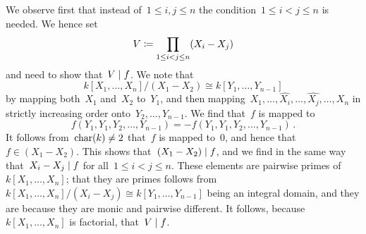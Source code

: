 \section{}

We observe first that instead of~$1 \leq i, j \leq n$ the condition~$1 \leq i < j \leq n$ is needed.
We hence set
\[
  V
  \coloneqq
  \prod_{1 \leq i < j \leq n} (X_i - X_j)
\]
and need to show that~$V \mid f$.
We note that
\[
  k[X_1, \dotsc, X_n]/(X_1 - X_2)
  \cong
  k[Y_1, \dotsc, Y_{n-1}]
\]
by mapping both~$X_1$ and~$X_2$ to~$Y_1$, and then mapping~$X_1, \dotsc, \widehat{X_i}, \dotsc, \widehat{X_j}, \dotsc, X_n$ in strictly increasing order onto~$Y_2, \dotsc, Y_{n-1}$.
We find that~$f$ is mapped to
\[
  f(Y_1, Y_1, Y_2, \dotsc, Y_{n-1})
  =
  -f(Y_1, Y_1, Y_2, \dotsc, Y_{n-1})  \,.
\]
It follows from~$\operatorname{char}(k) \neq 2$ that~$f$ is mapped to~$0$, and hence that~$f \in (X_1 - X_2)$.
This shows that~$(X_1 - X_2) \mid f$, and we find in the same way that~$X_i - X_j \mid f$ for all~$1 \leq i < j \leq n$.
These elements are pairwise  primes of~$k[X_1, \dotsc, X_n]$;
that they are primes follows from~$k[X_1, \dotsc, X_n]/(X_i - X_j) \cong k[Y_1, \dotsc, Y_{n-1}]$ being an integral domain, and they are  because they are monic and pairwise different.
It follows, because~$k[X_1, \dotsc, X_n]$ is factorial, that~$V \mid f$.


